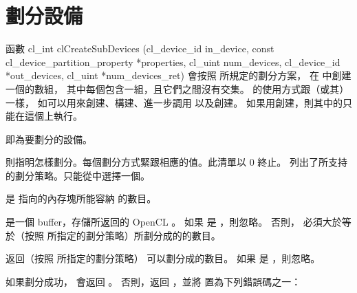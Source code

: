 \section{劃分設備}
函數
\startclc[indentnext=no]
cl_int clCreateSubDevices (cl_device_id in_device,
			   const cl_device_partition_property *properties,
			   cl_uint num_devices,
			   cl_device_id *out_devices,
			   cl_uint *num_devices_ret)
\stopclc
會按照  所規定的劃分方案，
在  中創建一個的數組，
其中每個包含一組，且它們之間沒有交集。
的使用方式跟（或其）一樣，
如可以用來創建、構建、進一步調用  以及創建。
如果用創建，則其中的只能在這個上執行。

 即為要劃分的設備。

 則指明怎樣劃分。每個劃分方式緊跟相應的值。此清單以 0 終止。
列出了所支持的劃分策略。只能從中選擇一個。

{}

 是  指向的內存塊所能容納  的數目。

 是一個 buffer，存儲所返回的 OpenCL 。
如果  是 ，則忽略。
否則，  必須大於等於（按照  所指定的劃分策略）所劃分成的的數目。

 返回（按照  所指定的劃分策略） 可以劃分成的數目。
如果  是 ，則忽略。

如果劃分成功，  會返回 。
否則，返回 ，並將  置為下列錯誤碼之一：

